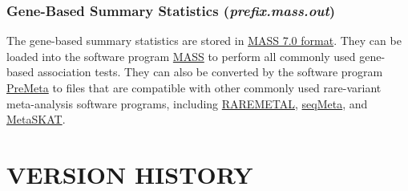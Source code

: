 \documentclass[12pt,letter]{article}
\begin{document}
\subsubsection{Gene-Based Summary Statistics ({\it prefix.mass.out})}
The gene-based summary statistics are stored in \href{http://dlin.web.unc.edu/software/mass/}{MASS 7.0 format}.
They can be loaded into the software program 
\href{http://dlin.web.unc.edu/software/mass/}{MASS} to perform all commonly used gene-based association tests.
They can also be converted by the software program 
\href{http://dlin.web.unc.edu/software/premeta/}{PreMeta} to files that are compatible with
other commonly used rare-variant meta-analysis software programs,
including \href{http://genome.sph.umich.edu/wiki/RAREMETAL_Documentation}{RAREMETAL}, 
\href{https://cran.r-project.org/web/packages/seqMeta/index.html}{seqMeta}, 
and \href{https://cran.r-project.org/web/packages/MetaSKAT/index.html}{MetaSKAT}.  

\section{VERSION HISTORY}
\end{document}
